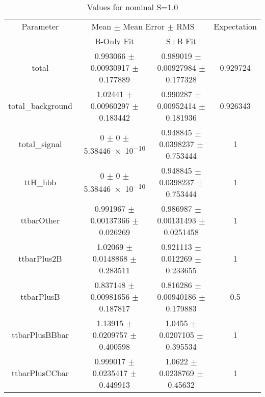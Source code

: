 \begin{table}
\centering
\caption{Values for nominal S=1.0}
\begin{tabular}{cccc}
\toprule
Parameter & \multicolumn{2}{c}{Mean $\pm$ Mean Error $\pm$ RMS} & Expectation\\
 & B-Only Fit & S+B Fit & \\
\midrule
total & \num{0.993066} $\pm$ \num{0.00930917} $\pm$ \num{0.177889} & \num{0.989019} $\pm$ \num{0.00927984} $\pm$ \num{0.177328} & \num{0.929724}\\
total\_background & \num{1.02441} $\pm$ \num{0.00960297} $\pm$ \num{0.183442} & \num{0.990287} $\pm$ \num{0.00952414} $\pm$ \num{0.181936} & \num{0.926343}\\
total\_signal & \num{0} $\pm$ \num{0} $\pm$ \num{5.38446e-10} & \num{0.948845} $\pm$ \num{0.0398237} $\pm$ \num{0.753444} & \num{1}\\
ttH\_hbb & \num{0} $\pm$ \num{0} $\pm$ \num{5.38446e-10} & \num{0.948845} $\pm$ \num{0.0398237} $\pm$ \num{0.753444} & \num{1}\\
ttbarOther & \num{0.991967} $\pm$ \num{0.00137366} $\pm$ \num{0.026269} & \num{0.986987} $\pm$ \num{0.00131493} $\pm$ \num{0.0251458} & \num{1}\\
ttbarPlus2B & \num{1.02069} $\pm$ \num{0.0148868} $\pm$ \num{0.283511} & \num{0.921113} $\pm$ \num{0.012269} $\pm$ \num{0.233655} & \num{1}\\
ttbarPlusB & \num{0.837148} $\pm$ \num{0.00981656} $\pm$ \num{0.187817} & \num{0.816286} $\pm$ \num{0.00940186} $\pm$ \num{0.179883} & \num{0.5}\\
ttbarPlusBBbar & \num{1.13915} $\pm$ \num{0.0209757} $\pm$ \num{0.400598} & \num{1.0455} $\pm$ \num{0.0207105} $\pm$ \num{0.395534} & \num{1}\\
ttbarPlusCCbar & \num{0.999017} $\pm$ \num{0.0235417} $\pm$ \num{0.449913} & \num{1.0622} $\pm$ \num{0.0238769} $\pm$ \num{0.45632} & \num{1}\\
\bottomrule
\end{tabular}
\end{table}